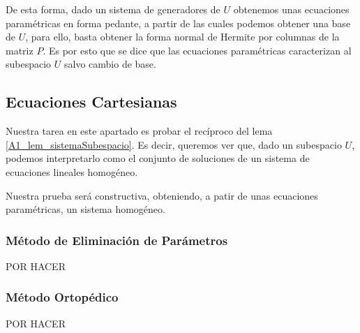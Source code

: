 De esta forma, dado un sistema de generadores de $U$ obtenemos unas ecuaciones paramétricas en forma pedante, a partir de las cuales podemos obtener una base de $U$, para ello, basta obtener la forma normal de Hermite por columnas de la matriz $P$. Es por esto que se dice que las ecuaciones paramétricas caracterizan al subespacio $U$ salvo cambio de base.
\subsection{Ecuaciones Cartesianas}
Nuestra tarea en este apartado es probar el recíproco del lema \ref{A1_lem_sistemaSubespacio}. Es decir, queremos ver que, dado un subespacio $U$, podemos interpretarlo como el conjunto de soluciones de un sistema de ecuaciones lineales homogéneo. 

Nuestra prueba será constructiva, obteniendo, a patir de unas ecuaciones paramétricas, un sistema homogéneo.
\subsubsection{Método de Eliminación de Parámetros}
POR HACER
\subsubsection{Método Ortopédico}
POR HACER

